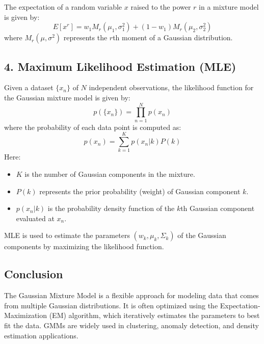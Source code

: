 \documentclass{article}
\begin{document}
The expectation of a random variable \(x\) raised to the power \(r\) in a mixture model is given by:
\[
E[x^r] = w_1M_r(\mu_1,\sigma_1^2) + (1 - w_1)M_r(\mu_2,\sigma_2^2)
\]
where \(M_r(\mu, \sigma^2)\) represents the \(r\)th moment of a Gaussian distribution.

\subsection*{4. Maximum Likelihood Estimation (MLE)}
Given a dataset \( \{x_n\} \) of \(N\) independent observations, the likelihood function for the Gaussian mixture model is given by:
\[
p(\{x_n\}) = \prod_{n=1}^{N} p(x_n)
\]
where the probability of each data point is computed as:
\[
p(x_n) = \sum_{k=1}^{K} p(x_n|k) P(k)
\]
Here:
\begin{itemize}
    \item \(K\) is the number of Gaussian components in the mixture.
    \item \(P(k)\) represents the prior probability (weight) of Gaussian component \(k\).
    \item \(p(x_n|k)\) is the probability density function of the \(k\)th Gaussian component evaluated at \(x_n\).
\end{itemize}
MLE is used to estimate the parameters \((w_k, \mu_k, \Sigma_k)\) of the Gaussian components by maximizing the likelihood function.

\subsection*{Conclusion}
The Gaussian Mixture Model is a flexible approach for modeling data that comes from multiple Gaussian distributions. It is often optimized using the Expectation-Maximization (EM) algorithm, which iteratively estimates the parameters to best fit the data. GMMs are widely used in clustering, anomaly detection, and density estimation applications.
\end{document}
